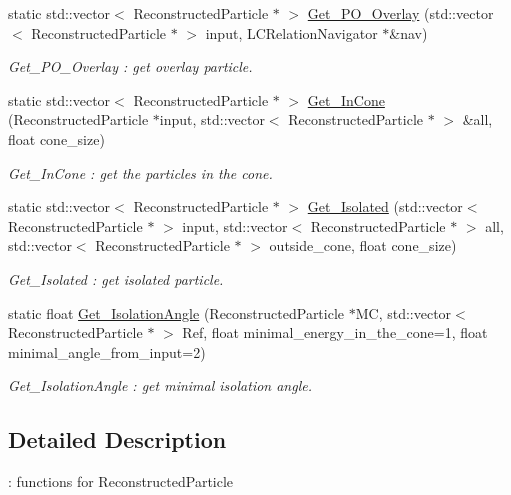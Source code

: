 \begin{DoxyCompactItemize}
static std::vector$<$ ReconstructedParticle $\ast$ $>$ \hyperlink{classToolSet_1_1CRC_a4ebcccc808e546491c383b327bcc029d}{Get\_\-PO\_\-Overlay} (std::vector$<$ ReconstructedParticle $\ast$ $>$ input, LCRelationNavigator $\ast$\&nav)
\begin{DoxyCompactList}\small\item\em Get\_\-PO\_\-Overlay : get overlay particle. \item\end{DoxyCompactList}\item 
static std::vector$<$ ReconstructedParticle $\ast$ $>$ \hyperlink{classToolSet_1_1CRC_a336841f7c8474540deb1cd1f119f5cf2}{Get\_\-InCone} (ReconstructedParticle $\ast$input, std::vector$<$ ReconstructedParticle $\ast$ $>$ \&all, float cone\_\-size)
\begin{DoxyCompactList}\small\item\em Get\_\-InCone : get the particles in the cone. \item\end{DoxyCompactList}\item 
static std::vector$<$ ReconstructedParticle $\ast$ $>$ \hyperlink{classToolSet_1_1CRC_ae38bc9fed9fc07e1cea7543dca8920c2}{Get\_\-Isolated} (std::vector$<$ ReconstructedParticle $\ast$ $>$ input, std::vector$<$ ReconstructedParticle $\ast$ $>$ all, std::vector$<$ ReconstructedParticle $\ast$ $>$ outside\_\-cone, float cone\_\-size)
\begin{DoxyCompactList}\small\item\em Get\_\-Isolated : get isolated particle. \item\end{DoxyCompactList}\item 
static float \hyperlink{classToolSet_1_1CRC_aa04cedd2faab9dc50787a88b0207cc8f}{Get\_\-IsolationAngle} (ReconstructedParticle $\ast$MC, std::vector$<$ ReconstructedParticle $\ast$ $>$ Ref, float minimal\_\-energy\_\-in\_\-the\_\-cone=1, float minimal\_\-angle\_\-from\_\-input=2)
\begin{DoxyCompactList}\small\item\em Get\_\-IsolationAngle : get minimal isolation angle. \item\end{DoxyCompactList}\end{DoxyCompactItemize}


\subsection{Detailed Description}
: functions for ReconstructedParticle 

